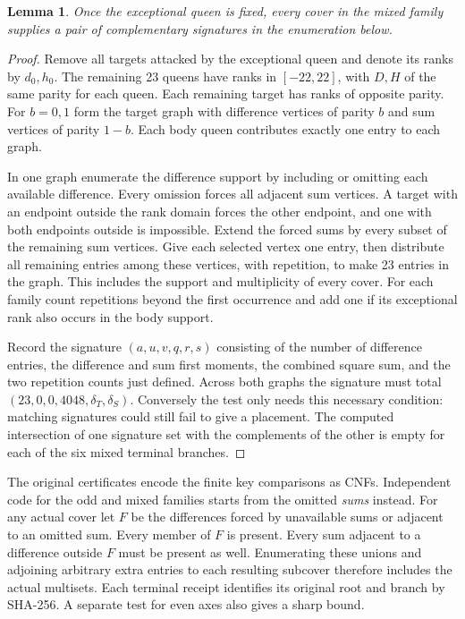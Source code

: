 \documentclass[11pt]{article}
\newtheorem{lemma}[theorem]{Lemma}
\begin{document}
\begin{lemma}\label{lem:mixed-enum}
Once the exceptional queen is fixed, every cover in the mixed family
supplies a pair of complementary signatures in the enumeration below.
\end{lemma}
\begin{proof}
Remove all targets attacked by the exceptional queen and denote its
ranks by $d_0,h_0$. The remaining 23 queens have ranks in $[-22,22]$,
with $D,H$ of the same parity for each queen. Each remaining target has
ranks of opposite parity. For $b=0,1$ form the target graph with
difference vertices of parity $b$ and sum vertices of parity $1-b$.
Each body queen contributes exactly one entry to each graph.

In one graph enumerate the difference support by including or omitting
each available difference. Every omission forces all adjacent sum
vertices. A target with an endpoint outside the rank domain forces
the other endpoint, and one with both endpoints outside is impossible.
Extend the forced sums by every subset of the remaining sum vertices.
Give each selected vertex one entry, then distribute all remaining entries
among these vertices, with repetition, to make 23 entries in the graph.
This includes the support and multiplicity of every cover.
For each family count repetitions beyond the first occurrence and add one
if its exceptional rank also occurs in the body support.

Record the signature $(a,u,v,q,r,s)$ consisting of the number of
difference entries, the difference and sum first moments, the combined
square sum, and the two repetition counts just defined. Across both
graphs the signature must total $(23,0,0,4048,\delta_T,\delta_S)$.
Conversely the test only needs this necessary condition: matching
signatures could still fail to give a placement. The computed
intersection of one signature set with the complements of the other is
empty for each of the six mixed terminal branches.
\end{proof}

The original certificates encode the finite key comparisons as CNFs.
Independent code for the odd and mixed families starts from the omitted
\emph{sums} instead. For any actual cover let $F$ be the differences forced
by unavailable sums or adjacent to an omitted sum. Every member of $F$
is present. Every sum adjacent to a difference outside $F$ must be
present as well. Enumerating these unions and adjoining arbitrary extra
entries to each resulting subcover therefore includes the actual
multisets. Each terminal receipt identifies its original root and branch
by SHA-256. A separate test for even axes also gives a sharp bound.
\end{document}
